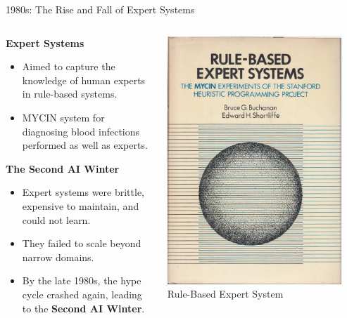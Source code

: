 \documentclass{beamer}
\begin{document}
\begin{frame}[t]{1980s: The Rise and Fall of Expert Systems}
\begin{columns}
    \begin{column}{0.6\textwidth}
        \textbf{Expert Systems}
        \begin{itemize}
            \item Aimed to capture the knowledge of human experts in rule-based systems.
            \item MYCIN system for diagnosing blood infections performed as well as experts.
        \end{itemize}
        \textbf{The Second AI Winter}
        \begin{itemize}
            \item Expert systems were \alert{brittle}, expensive to maintain, and could not learn.
            \item They failed to scale beyond narrow domains.
            \item By the late 1980s, the hype cycle crashed again, leading to the \textbf{Second AI Winter}.
        \end{itemize}
    \end{column}
    \begin{column}{0.4\textwidth}
        \includegraphics[width=0.9\textwidth]{images/mycin.jpg}
        \\\scriptsize{Rule-Based Expert System}
    \end{column}
\end{columns}
\end{frame}
\end{document}

